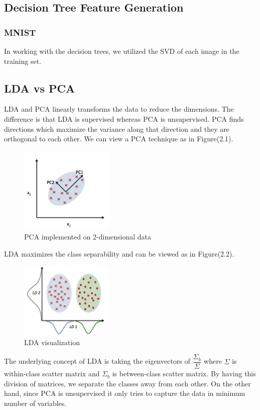 \subsection{Decision Tree Feature Generation}

\subsubsection{MNIST}

In working with the decision trees, we utilized the SVD of each image in the training set. 


\subsection{LDA vs PCA}

LDA and PCA linearly transforms the data to reduce the dimensions. The difference is that LDA is supervised whereas PCA is unsupervised. PCA finds directions which maximize the variance along that direction and they are orthogonal to each other. We can view a PCA technique as in Figure(2.1). 

	\begin{figure}[H]
		\centering\includegraphics[width=0.4\textwidth]{../images/pca}
		\caption{PCA implemented on 2-dimensional data}
	\end{figure}

LDA maximizes the class separability and can be viewed as in Figure(2.2). 
	\begin{figure}[H]
	\centering\includegraphics[width=0.4\textwidth]{../images/lda}
	\caption{LDA visualization}
	\end{figure}
The underlying concept of LDA is taking the eigenvectors of $ \dfrac{\Sigma_b}{\Sigma}$ where $\Sigma$ is within-class scatter matrix and $\Sigma_b$ is between-class scatter matrix. By having this division of matrices, we separate the classes away from each other. On the other hand, since PCA is unsupervised it only tries to capture the data in minimum number of variables. 
